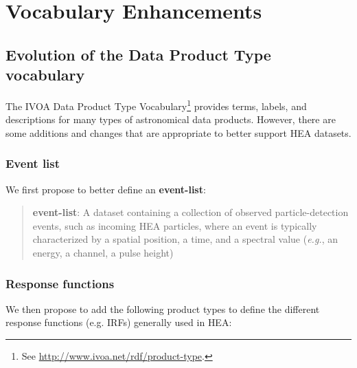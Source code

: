 \documentclass[11pt,a4paper]{ivoa}
\begin{document}
\section{Vocabulary Enhancements}
\label{sec:voc}

\subsection{Evolution of the Data Product Type vocabulary}
\label{sec:voc_product_type}

The \gls{IVOA} Data Product Type Vocabulary\footnote{See \url{http://www.ivoa.net/rdf/product-type}.} provides terms, labels, and descriptions for many types of astronomical data products. However, there are some additions and changes that are appropriate to better support \gls{HEA} datasets.


\subsubsection{Event list}

We first propose to better define an {\bf event-list}:

\begin{quote}
{\bf event-list}: A dataset containing a collection of observed particle-detection events, such as incoming \gls{HEA} particles, where an event is typically characterized by a spatial position, a time, and a spectral value ({\em e.g.\/}, an energy, a channel, a pulse height)
\end{quote}

\subsubsection{Response functions}

We then propose to add the following product types to define the different response functions (e.g. \glspl{IRF}) generally used in \gls{HEA}:
\end{document}
